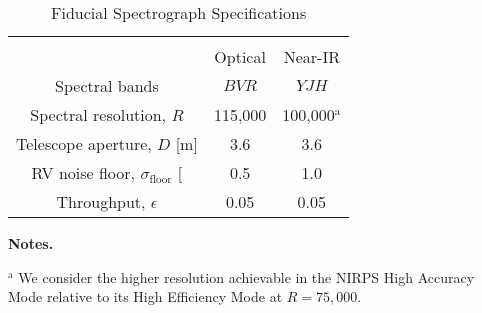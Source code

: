 \begin{table*}
  \small
  \renewcommand{\arraystretch}{0.7}
  \caption{Fiducial Spectrograph Specifications}
  \label{RVFCtable:spectrographs}
  \begin{tabular}{ccc}
    \hline \\ [-1ex]
    & Optical & Near-IR \\
    \hline
    Spectral bands & $BVR$ & $YJH$ \\
    Spectral resolution, $R$ & 115,000 & 100,000$^{\text{a}}$ \\
    Telescope aperture, $D$ [m] & 3.6 & 3.6 \\
    RV noise floor, $\sigma_{\text{floor}}$ [\mps{]} & 0.5 & 1.0 \\
    Throughput, $\epsilon$ & 0.05 & 0.05
  \end{tabular}
  \begin{list}{}{}
    \item {\bf{Notes.}}
    \item $^{\text{a}}$ We consider the higher resolution achievable in the NIRPS High Accuracy Mode relative to its High Efficiency Mode at $R = 75,000$.
  \end{list}
\end{table*}
